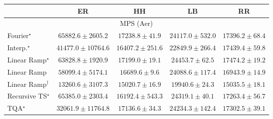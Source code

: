 \begin{tabular}{l|cccc|}
\toprule
            & ER & HH & LB & RR \\
\midrule
\multicolumn{5}{c}{\rule{0pt}{8pt}MPS (Aer)} \\
\midrule
Fourier$^\star$ & {\cellcolor[HTML]{84248A}} \color[HTML]{F1F1F1} $65882.6\pm 2605.2$ & {\cellcolor[HTML]{BED2E6}} \color[HTML]{000000} $17238.8\pm 41.9$ & {\cellcolor[HTML]{A8C3DE}} \color[HTML]{000000} $24117.0\pm 532.0$ & {\cellcolor[HTML]{BDD1E5}} \color[HTML]{000000} $17396.2\pm 68.4$ \\
Interp.$^\star$ & {\cellcolor[HTML]{8C89C0}} \color[HTML]{F1F1F1} $41477.0\pm 10764.6$ & {\cellcolor[HTML]{C0D4E6}} \color[HTML]{000000} $16407.2\pm 251.6$ & {\cellcolor[HTML]{ACC6DF}} \color[HTML]{000000} $22849.9\pm 266.4$ & {\cellcolor[HTML]{BDD1E5}} \color[HTML]{000000} $17439.4\pm 59.8$ \\
Linear Ramp$^\star$ & {\cellcolor[HTML]{852D90}} \color[HTML]{F1F1F1} $63828.8\pm 1920.9$ & {\cellcolor[HTML]{BED2E6}} \color[HTML]{000000} $17199.0\pm 19.1$ & {\cellcolor[HTML]{A7C2DD}} \color[HTML]{000000} $24453.7\pm 62.5$ & {\cellcolor[HTML]{BDD1E5}} \color[HTML]{000000} $17474.2\pm 19.2$ \\
Linear Ramp & {\cellcolor[HTML]{8947A0}} \color[HTML]{F1F1F1} $58099.4\pm 5174.1$ & {\cellcolor[HTML]{BFD3E6}} \color[HTML]{000000} $16689.6\pm 9.6$ & {\cellcolor[HTML]{A8C3DE}} \color[HTML]{000000} $24088.6\pm 117.4$ & {\cellcolor[HTML]{BED2E6}} \color[HTML]{000000} $16943.9\pm 14.9$ \\
Linear Ramp$^\dagger$ & {\cellcolor[HTML]{C9DBEA}} \color[HTML]{000000} $13260.6\pm 3107.3$ & {\cellcolor[HTML]{C4D7E8}} \color[HTML]{000000} $15020.7\pm 16.9$ & {\cellcolor[HTML]{B5CCE3}} \color[HTML]{000000} $19940.6\pm 24.3$ & {\cellcolor[HTML]{C4D7E8}} \color[HTML]{000000} $15035.5\pm 18.1$ \\
Recursive TS$^\star$ & {\cellcolor[HTML]{84278C}} \color[HTML]{F1F1F1} $65385.0\pm 2303.4$ & {\cellcolor[HTML]{C1D4E7}} \color[HTML]{000000} $16192.4\pm 543.3$ & {\cellcolor[HTML]{A8C3DE}} \color[HTML]{000000} $24319.1\pm 40.1$ & {\cellcolor[HTML]{BED2E6}} \color[HTML]{000000} $17263.4\pm 56.7$ \\
TQA$^\star$ & {\cellcolor[HTML]{96ACD2}} \color[HTML]{F1F1F1} $32061.9\pm 11764.8$ & {\cellcolor[HTML]{BED2E6}} \color[HTML]{000000} $17136.6\pm 34.3$ & {\cellcolor[HTML]{A8C3DE}} \color[HTML]{000000} $24234.3\pm 142.4$ & {\cellcolor[HTML]{BDD1E5}} \color[HTML]{000000} $17302.5\pm 39.1$ \\

\end{tabular}
